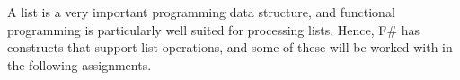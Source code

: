 A list is a very important programming data structure, and functional programming is particularly well suited for processing lists. Hence, F\# has constructs that support list operations, and some of these will be worked with in the following assignments.